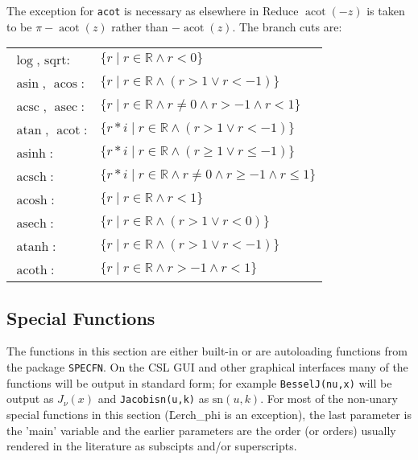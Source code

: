 The exception for \texttt{acot} is necessary as elsewhere in Reduce
$\mathop{\mathrm{acot}}(-z)$ is taken to be $\pi - \mathop{\mathrm{acot}}(z)$
rather than $-\mathop{\mathrm{acot}}(z)$.
The branch cuts are:\\
\begin{tabular}{ll}
  $\log$, $\mathrm{sqrt}$:     & $ \{r   \mid r \in\mathbb{R} \land r < 0\} $\\
  $\mathop{\mathrm{asin}}$, $\mathop{\mathrm{acos}}$: & $ \{r   \mid r \in\mathbb{R} \land (r > 1 \lor r < -1)\} $\\
  $\mathop{\mathrm{acsc}}$, $\mathop{\mathrm{asec}}$: & $ \{r   \mid r \in\mathbb{R} \land r \neq 0 \land r > -1 \land r < 1\} $\\
  $\mathop{\mathrm{atan}}$, $\mathop{\mathrm{acot}}$: & $ \{r*i \mid r \in\mathbb{R} \land (r > 1 \lor r < -1)\} $\\
  $\mathop{\mathrm{asinh}}$:         & $ \{r*i \mid r \in\mathbb{R} \land (r \geq  1 \lor r \leq  -1)\} $\\
  $\mathop{\mathrm{acsch}}$:         & $ \{r*i \mid r \in\mathbb{R} \land r \neq 0 \land r \geq  -1 \land r \leq  1\} $\\
  $\mathop{\mathrm{acosh}}$:         & $ \{r   \mid r \in\mathbb{R} \land r < 1\} $\\
  $\mathop{\mathrm{asech}}$:         & $ \{r   \mid r \in\mathbb{R} \land (r > 1 \lor r < 0)\} $\\
  $\mathop{\mathrm{atanh}}$:         & $ \{r   \mid r \in\mathbb{R} \land (r > 1 \lor r < -1)\} $\\
  $\mathop{\mathrm{acoth}}$:         & $ \{r   \mid r \in\mathbb{R} \land r > -1 \land r < 1\} $
\end{tabular}

\subsection{Special Functions}
The functions in this section are either built-in or are autoloading
functions from the package \texttt{SPECFN}. On the CSL GUI and other graphical
interfaces many of the functions will be output in standard form; for example
\texttt{BesselJ(nu,x)} will be output as $J_\nu(x)$ and \texttt{Jacobisn(u,k)}
as $\mathrm{sn}(u,k)$. For most of the non-unary special functions in this
section (\f{Lerch\_phi} is an exception), the last parameter is the 'main'
variable and the earlier parameters are the order (or orders)
usually rendered in the literature as subscipts and/or superscripts.

